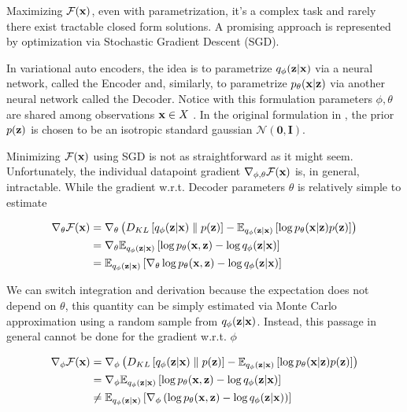 \documentclass[12pt]{article}
\begin{document}
Maximizing \(\mathcal{F}(\textbf{x})\), even with parametrization, it's a complex task and rarely there exist tractable closed form solutions. A promising approach is represented by optimization via Stochastic Gradient Descent (SGD).


In variational auto encoders, the idea is to parametrize \(q_{\phi}( \textbf{z}| \textbf{x})\) via a neural network, called the Encoder and, similarly, to parametrize \(p_{\theta}( \textbf{x}| \textbf{z})\) via another neural network called the Decoder. Notice with this formulation parameters \(\phi, \theta\) are shared among observations \(\textbf{x} \in  X\) \cite{VAEIntro}. In the original formulation in \cite{kingma2022autoencoding}, the prior \(p( \textbf{z})\) is chosen to be an isotropic standard gaussian \(\mathcal{N}(\textbf{0}, \textbf{I})\). 


Minimizing \(\mathcal{F}( \textbf{x})\) using SGD is not as straightforward as it might seem. Unfortunately, the individual datapoint gradient \(\nabla_{\phi, \theta}\mathcal{F}(\textbf{x})\) is, in general, intractable\cite{VAEIntro}. While the gradient w.r.t. Decoder parameters \(\theta\) is relatively simple to estimate

\begin{align}
    \nabla_{\theta}\mathcal{F}(\textbf{x}) &= \nabla_{\theta} \left( D_{KL}\left[ q_{\phi}(\textbf{z}|\textbf{x}) \parallel p(\textbf{z}) \right] - \mathbb{E}_{q_{\phi}(\textbf{z}|\textbf{x})} \left[ \log p_{\theta}(\textbf{x}|\textbf{z})p(\textbf{z}) \right] \right) \nonumber \\
    &= \nabla_{\theta} \mathbb{E}_{q_{\phi}(\textbf{z}|\textbf{x})} \left[\log p_\theta (\textbf{x}, \textbf{z}) - \log q_\phi (\textbf{z}|\textbf{x}) \right] \nonumber \\
    &= \mathbb{E}_{q_{\phi}(\textbf{z}|\textbf{x})} \left[\nabla_{\theta}\log p_\theta (\textbf{x}, \textbf{z}) - \log q_\phi (\textbf{z}|\textbf{x}) \right] 
\end{align}

We can switch integration and derivation because the expectation does not depend on \(\theta\), this quantity can be simply estimated via Monte Carlo approximation using a random sample from \(q_\phi (\textbf{z}|\textbf{x})\). Instead, this passage in general cannot be done for the gradient w.r.t. \(\phi\)

\begin{align}
    \label{eqn:grad_phi_ELBO}
    \nabla_{\phi}\mathcal{F}(\textbf{x}) &= \nabla_{\phi} \left( D_{KL}\left[ q_{\phi}(\textbf{z}|\textbf{x}) \parallel p(\textbf{z}) \right] - \mathbb{E}_{q_{\phi}(\textbf{z}|\textbf{x})} \left[ \log p_{\theta}(\textbf{x}|\textbf{z})p(\textbf{z}) \right] \right) \nonumber \\
    &= \nabla_{\phi} \mathbb{E}_{q_{\phi}(\textbf{z}|\textbf{x})} \left[\log p_\theta (\textbf{x}, \textbf{z}) - \log q_\phi (\textbf{z}|\textbf{x}) \right] \nonumber \\
    &\neq \mathbb{E}_{q_{\phi}(\textbf{z}|\textbf{x})} \left[\nabla_{\phi} \left( \log p_\theta (\textbf{x}, \textbf{z}) - \log q_\phi (\textbf{z}|\textbf{x}) \right) \right] 
\end{align}
\end{document}
